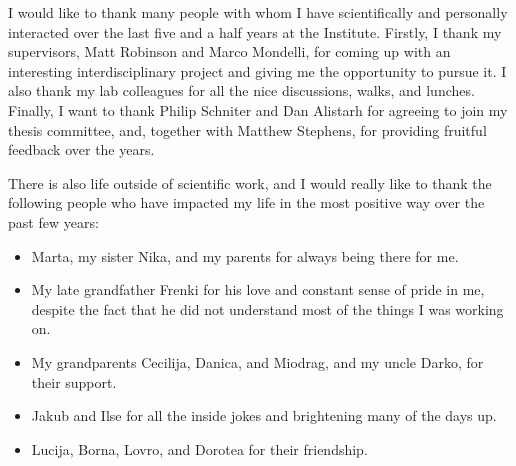 \documentclass[draft,final]{istaustriathesis}
\begin{document}
\begin{acknowledgements}
I would like to thank many people with whom I have scientifically and personally interacted
over the last five and a half years at the Institute. Firstly, I thank my supervisors, Matt Robinson and Marco Mondelli, 
for coming up with an interesting interdisciplinary project and giving me the opportunity to pursue it.
I also thank my lab colleagues for all the nice discussions, walks, and lunches. Finally, I want to thank Philip Schniter and Dan Alistarh for agreeing to join my thesis committee, and, together with Matthew Stephens, for providing fruitful feedback over the years.

There is also life outside of scientific work, and I would really like to thank the following people 
who have impacted my life in the most positive way over the past few years:
\begin{itemize}
\item Marta, my sister Nika, and my parents for always being there for me.
\item My late grandfather Frenki for his love and constant sense of pride in me, despite the fact that he did not understand most of the things I was working on.
\item My grandparents Cecilija, Danica, and Miodrag, and my uncle Darko, for their support.
\item Jakub and Ilse for all the inside jokes and brightening many of the days up.
\item Lucija, Borna, Lovro, and Dorotea for their friendship.
\end{itemize}
\bigskip\bigskip
\end{acknowledgements}
\end{document}
